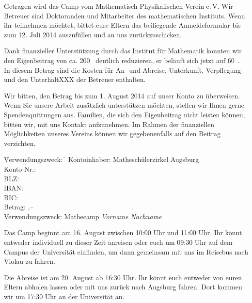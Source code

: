 \documentclass{zettel}
\begin{document}
Getragen wird das Camp vom Mathematisch-Physikalischen Verein e.\,V. Wir
Betreuer sind Doktoranden und Mitarbeiter des mathematischen Instituts.
Wenn ihr teilnehmen möchtet, bittet eure Eltern das beiliegende Anmeldeformular
bis zum 12. Juli 2014 auszufüllen und an uns zurückzuschicken.
\vspace{\medskipamount}

\begin{minipage}{0.54\textwidth}
Dank finanzieller Unterstützung durch das Institut für Mathematik konnten wir
den Eigenbeitrag von ca. 200~\texteuro{} deutlich reduzieren, er beläuft sich
jetzt auf 60~\texteuro. In diesem Betrag sind die Kosten für An- und Abreise,
Unterkunft, Verpflegung und den UnterhaltXXX der Betreuer enthalten.
\end{minipage}

\newpage

Wir bitten, den Betrag bis zum 1. August 2014 auf
unser Konto zu überweisen. Wenn Sie unsere Arbeit zusätzlich unterstützen
möchten, stellen wir Ihnen gerne Spendenquittungen aus. Familien, die sich den
Eigenbeitrag nicht leisten können, bitten wir, mit uns Kontakt aufzunehmen. Im
Rahmen der finanziellen Möglichkeiten unseres Vereins können wir gegebenenfalls
auf den Beitrag verzichten.

\vspace{-0.7em}
\begin{tabbing}
  \qquad\qquad \= Verwendungszweck:\, \= \kill
  \> Kontoinhaber: \> Matheschülerzirkel Augsburg \\
  \> Konto-Nr.:  \\
  \> BLZ:  \\
  \> IBAN:  \\
  \> BIC:  \\
  \> Betrag: ,-- \texteuro \\
  \> Verwendungszweck: \> Mathecamp \emph{Vorname Nachname}
\end{tabbing}
\vspace{-0.7em}

Das Camp beginnt am 16. August zwischen 10:00 Uhr und 11:00 Uhr. Ihr könnt
entweder individuell zu dieser Zeit anreisen oder euch um 09:30 Uhr auf dem Campus der
Universität einfinden, um dann gemeinsam mit uns im Reisebus nach Violau zu fahren.

Die Abreise ist am 20. August ab 16:30 Uhr. Ihr könnt euch entweder von euren
Eltern abholen lassen oder mit uns zurück nach Augsburg fahren. Dort kommen wir
um 17:30 Uhr an der Universität an.
\end{document}
